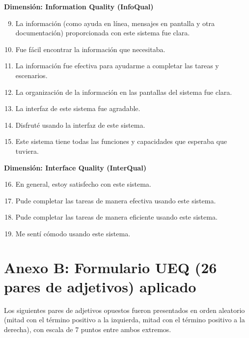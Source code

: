 \documentclass[a4paper,12pt]{report}
\begin{document}
\textbf{Dimensión: Information Quality (InfoQual)}
\begin{enumerate}
    \setcounter{enumi}{8}
    \item La información (como ayuda en línea, mensajes en pantalla y otra documentación) proporcionada con este sistema fue clara.
    \item Fue fácil encontrar la información que necesitaba.
    \item La información fue efectiva para ayudarme a completar las tareas y escenarios.
    \item La organización de la información en las pantallas del sistema fue clara.
    \item La interfaz de este sistema fue agradable.
    \item Disfruté usando la interfaz de este sistema.
    \item Este sistema tiene todas las funciones y capacidades que esperaba que tuviera.
\end{enumerate}

\textbf{Dimensión: Interface Quality (InterQual)}
\begin{enumerate}
    \setcounter{enumi}{15}
    \item En general, estoy satisfecho con este sistema.
    \item Pude completar las tareas de manera efectiva usando este sistema.
    \item Pude completar las tareas de manera eficiente usando este sistema.
    \item Me sentí cómodo usando este sistema.
\end{enumerate}

\section*{Anexo B: Formulario UEQ (26 pares de adjetivos) aplicado}

Los siguientes pares de adjetivos opuestos fueron presentados en orden aleatorio (mitad con el término positivo a la izquierda, mitad con el término positivo a la derecha), con escala de 7 puntos entre ambos extremos.

\end{document}
